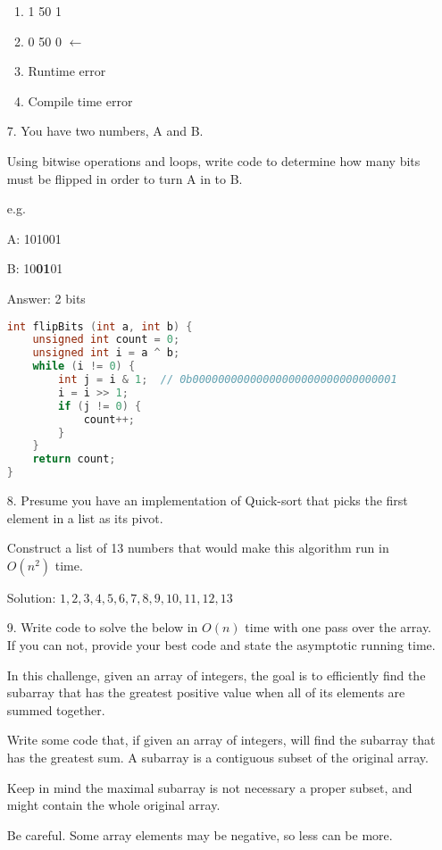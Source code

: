 \documentclass[letterpaper, 12pt]{article}
\begin{document}
\begin{itemize}
	\begin{enumerate}[label=(\alph*)]
		\item 1 50 1
		\item 0 50 0	$\leftarrow$
		\item Runtime error
		\item Compile time error
	\end{enumerate}

	\item[7.] You have two numbers, A and B.

	Using bitwise operations and loops, write code to determine how many bits must be flipped in order to turn A in to B.

	e.g.

	A: 101001

	B: 10\textbf{01}01

	Answer: 2 bits\\

\begin{lstlisting}[language=C, style=c]
int flipBits (int a, int b) {
	unsigned int count = 0;
	unsigned int i = a ^ b;
	while (i != 0) {
		int j = i & 1;	// 0b00000000000000000000000000000001
		i = i >> 1;
		if (j != 0) {
			count++;
		}
	}
	return count;
}
\end{lstlisting}

	\item[8.] Presume you have an implementation of Quick-sort that picks the first element in a list as its pivot.

	Construct a list of 13 numbers that would make this algorithm run in $O(n^2)$ time.

	Solution: $1, 2, 3, 4, 5, 6, 7, 8, 9, 10, 11, 12, 13$

	\item[9.] Write code to solve the below in $O(n)$ time with one pass over the array. If you can not, provide your best code and state the asymptotic running time.

	In this challenge, given an array of integers, the goal is to efficiently find the subarray that has the greatest positive value when all of its elements are summed together.

	Write some code that, if given an array of integers, will find the subarray that has the greatest sum. A subarray is a contiguous subset of the original array.

	Keep in mind the maximal subarray is not necessary a proper subset, and might contain the whole original array.

	Be careful. Some array elements may be negative, so less can be more.


\end{itemize}
\end{document}
